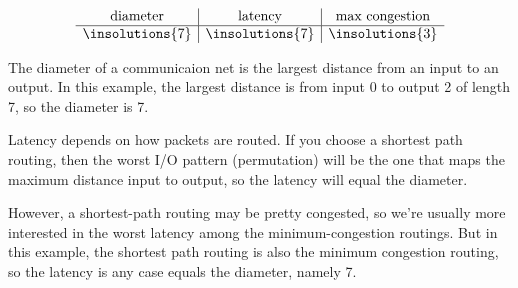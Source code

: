 \begin{problem}[4]
{\large
\[
\begin{array}{c|c|c}
\text{diameter} &
\text{latency} &
\text{max congestion} \\ \hline
\insolutions{7} &
\insolutions{7} &
\insolutions{3}
\end{array}
\]
}



  The diameter of a communicaion net is the largest distance from an input
  to an output.  In this example, the largest distance is from input 0 to
  output 2 of length 7, so the diameter is 7.

  Latency depends on how packets are routed.  If you choose a shortest
  path routing, then the worst I/O pattern (permutation) will be the one
  that maps the maximum distance input to output, so the latency will
  equal the diameter.

  However, a shortest-path routing may be pretty congested, so we're
  usually more interested in the worst latency among the
  minimum-congestion routings.  But in this example, the shortest path
  routing is also the minimum congestion routing, so the latency is any
  case equals the diameter, namely 7.
  
\end{problem}



